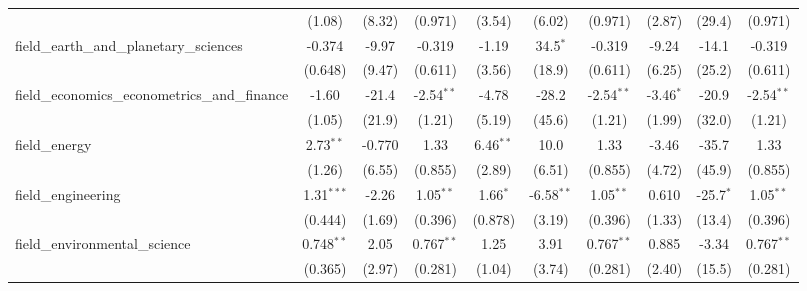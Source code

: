 \begin{tabular}{lccccccccc}
                                                               & (1.08)         & (8.32)         & (0.971)        & (3.54)         & (6.02)        & (0.971)        & (2.87)         & (29.4)         & (0.971)\\   
   field\_earth\_and\_planetary\_sciences                      & -0.374         & -9.97          & -0.319         & -1.19          & 34.5$^{*}$    & -0.319         & -9.24          & -14.1          & -0.319\\   
                                                               & (0.648)        & (9.47)         & (0.611)        & (3.56)         & (18.9)        & (0.611)        & (6.25)         & (25.2)         & (0.611)\\   
   field\_economics\_econometrics\_and\_finance                & -1.60          & -21.4          & -2.54$^{**}$   & -4.78          & -28.2         & -2.54$^{**}$   & -3.46$^{*}$    & -20.9          & -2.54$^{**}$\\   
                                                               & (1.05)         & (21.9)         & (1.21)         & (5.19)         & (45.6)        & (1.21)         & (1.99)         & (32.0)         & (1.21)\\   
   field\_energy                                               & 2.73$^{**}$    & -0.770         & 1.33           & 6.46$^{**}$    & 10.0          & 1.33           & -3.46          & -35.7          & 1.33\\   
                                                               & (1.26)         & (6.55)         & (0.855)        & (2.89)         & (6.51)        & (0.855)        & (4.72)         & (45.9)         & (0.855)\\   
   field\_engineering                                          & 1.31$^{***}$   & -2.26          & 1.05$^{**}$    & 1.66$^{*}$     & -6.58$^{**}$  & 1.05$^{**}$    & 0.610          & -25.7$^{*}$    & 1.05$^{**}$\\   
                                                               & (0.444)        & (1.69)         & (0.396)        & (0.878)        & (3.19)        & (0.396)        & (1.33)         & (13.4)         & (0.396)\\   
   field\_environmental\_science                               & 0.748$^{**}$   & 2.05           & 0.767$^{**}$   & 1.25           & 3.91          & 0.767$^{**}$   & 0.885          & -3.34          & 0.767$^{**}$\\   
                                                               & (0.365)        & (2.97)         & (0.281)        & (1.04)         & (3.74)        & (0.281)        & (2.40)         & (15.5)         & (0.281)\\   

\end{tabular}
